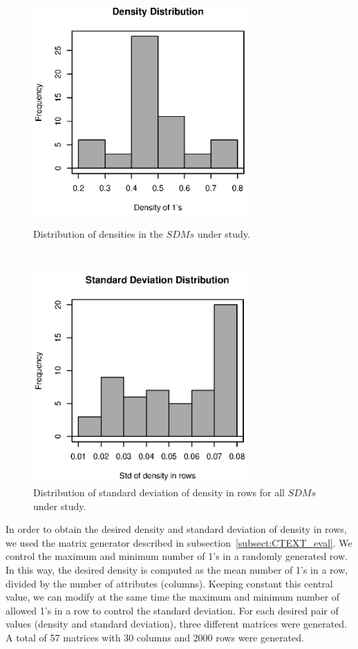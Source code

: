 \documentclass[authoryear,11pt]{elsarticle}
\begin{document}
	\begin{figure}[htb]
	\begin{minipage}{.5\textwidth}
	    \begin{center}
	       \includegraphics[height=8cm]{density_freq.eps}
	    \end{center}
	\caption{Distribution of densities in the $SDMs$ under study.}
	\label{fig:density}
	~
	\end{minipage}%
	\begin{minipage}{.5\textwidth}
	    \begin{center}
	       \includegraphics[height=8cm]{std_freq.eps}
	    \end{center}
	\caption{Distribution of standard deviation of density in rows for all $SDMs$ under study.}
	\label{fig:std}
	\end{minipage}	
	\end{figure}		
	
	In order to obtain the desired density and standard deviation of density in rows, we used the 
	matrix generator described in subsection~\ref{subsect:CTEXT_eval}. We control the maximum and
	minimum number of 1's in a randomly generated row. In this way, the desired density is computed
	as the mean number of 1's in a row, divided by the number of attributes (columns). Keeping 
	constant this central value, we can modify at the same time the maximum and minimum number of
	allowed 1's in a row to control the standard deviation. For each desired pair of values (density 
	and standard deviation), three different matrices were generated. A total of 57 matrices with
	30 columns and 2000 rows were generated.
	
\end{document}
